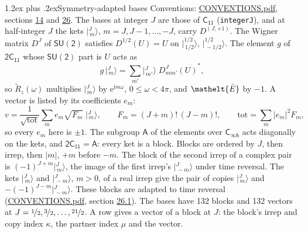\documentclass[10pt,a4paper]{article}
\makeatletter
\renewcommand\section{\@startsection{section}{1}{\z@}{-3ex plus -1ex minus -.2ex}%
  {1.2ex plus .2ex}{\normalfont\large\sffamily\bfseries\color{parttitle}}}
\numberwithin{equation}{section}
\newcommand{\eltfont}[1]{{\let\sigma\eltsigma\mathelt{#1}}}
\newcommand{\grp}[1]{\mathsf{#1}}
\newcommand{\elt}[1]{\eltfont{#1}}
\newcommand{\iunit}{\mathrm{i}}
\newcommand{\expe}{\mathrm{e}}
\newcommand{\irrJp}[2]{D^{(#1,#2)}}
\newcommand{\wignerD}[1]{D^{#1}}
\newcommand{\conj}[1]{{#1}^{*}}
\newcommand{\mult}{\kappa}
\newcommand{\intx}{\mu}
\newcommand{\jm}[2]{\bigl\lvert{}^{#1}_{\,#2}\bigr\rangle}
\newcommand{\barred}[1]{\bar{#1}}
\newcommand{\lift}[1]{\tilde{#1}}
\makeatother
\begin{document}
\section{Symmetry-adapted bases}\label{s:bases}
Conventions: \href{../../CONVENTIONS.pdf}{CONVENTIONS.pdf}, sections \href{../../../rotation/CONVENTIONS.pdf\#conv.14}{14} and \href{../../CONVENTIONS.pdf\#conv.26}{26}.
\leavevmode\label{n:index.m}\label{n:vector.ket}The bases at integer $J$ are those of \href{../../../rotation/data/pdf/C11.pdf}{$\grp{C_{11}}$} (\texttt{integerJ}), and at half-integer $J$ the kets $\jm{J}{m}$, $m = J, J-1, \dots, -J$, carry $\irrJp{J}{+1}$. \label{n:matrix.wigner}The Wigner matrix $\wignerD{J}$ of $\grp{SU(2)}$ satisfies $\wignerD{1/2}(U) = U$ on $\jm{1/2}{1/2}$, $\jm{1/2}{-1/2}$. The element $g$ of $\grp{2C_{11}}$ whose $\grp{SU(2)}$ part is $U$ acts as
\begin{equation}\label{e:action}g\,\jm{J}{m} = \sum_{m'} \jm{J}{m'}\; \conj{\wignerD{J}_{m m'}(U)},\end{equation}
so $\lift{R}_{z}(\omega)$ multiplies $\jm{J}{m}$ by $\expe^{\iunit m\omega}$, $0 \le \omega < 4\pi$, and $\elt{\barred{E}}$ by $-1$. \label{n:index.ketcoefficient}\label{n:vector.basis.symmetry}\label{n:index.ketweight}\label{n:index.total}A vector is listed by its coefficients $e_m$:
\begin{equation}\label{e:ket}v = \frac{1}{\sqrt{\mathrm{tot}}}\sum_m e_m\sqrt{F_m}\;\jm{J}{m},\qquad F_m = (J+m)!\,(J-m)!,\qquad \mathrm{tot} = \sum_m |e_m|^2F_m,\end{equation}
so every $e_m$ here is $\pm 1$.
\leavevmode\label{n:group.A}The subgroup $\grp{A}$ of the elements over $\grp{C_{\infty h}}$ acts diagonally on the kets, and $\grp{2C_{11}} = \grp{A}$: every ket is a block. Blocks are ordered by $J$, then irrep, then $|m|$, $+m$ before $-m$. The block of the second irrep of a complex pair is $(-1)^{J+m}\jm{J}{m}$, the image of the first irrep's $\jm{J}{-m}$ under time reversal. The kets $\jm{J}{m}$ and $\jm{J}{-m}$, $m > 0$, of a real irrep give the pair of copies $\jm{J}{m}$ and $-(-1)^{J-m}\jm{J}{-m}$. These blocks are adapted to time reversal (\href{../../CONVENTIONS.pdf}{CONVENTIONS.pdf}, section \href{../../CONVENTIONS.pdf\#conv.26.1}{26.1}).
The bases have 132 blocks and 132 vectors at $J = \nicefrac{1}{2}, \nicefrac{3}{2}, \dots, \nicefrac{21}{2}$. \label{n:index.copy}\label{n:head.vector}A row gives a vector of a block at $J$: the block's irrep and copy index $\mult$, the partner index $\intx$ and the vector.
\end{document}
